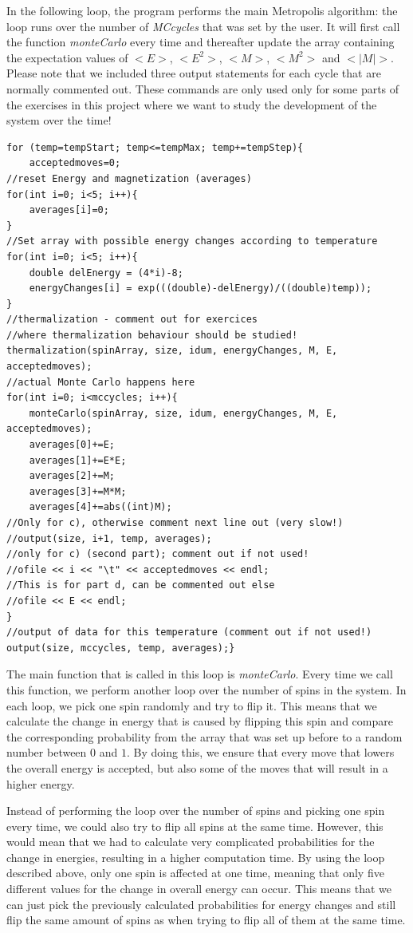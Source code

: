 \documentclass[10pt,a4paper]{article}
\begin{document}
In the following loop, the program performs the main Metropolis algorithm: the loop runs over the number of \emph{MCcycles} that was set by the user. It will first call the function \emph{monteCarlo} every time and thereafter update the array containing the expectation values of $<E>$, $<E^2>$, $<M>$, $<M^2>$ and $<|M|>$. Please note that we included three output statements for each cycle that are normally commented out. These commands are only used only for some parts of the exercises in this project where we want to study the development of the system over the time!

\begin{lstlisting}
for (temp=tempStart; temp<=tempMax; temp+=tempStep){
	acceptedmoves=0;
//reset Energy and magnetization (averages)
for(int i=0; i<5; i++){
	averages[i]=0;
}
//Set array with possible energy changes according to temperature
for(int i=0; i<5; i++){
	double delEnergy = (4*i)-8;
	energyChanges[i] = exp(((double)-delEnergy)/((double)temp));
}
//thermalization - comment out for exercices
//where thermalization behaviour should be studied!
thermalization(spinArray, size, idum, energyChanges, M, E, acceptedmoves);
//actual Monte Carlo happens here
for(int i=0; i<mccycles; i++){
	monteCarlo(spinArray, size, idum, energyChanges, M, E, acceptedmoves);
	averages[0]+=E;
	averages[1]+=E*E;
	averages[2]+=M;
	averages[3]+=M*M;
	averages[4]+=abs((int)M);
//Only for c), otherwise comment next line out (very slow!)
//output(size, i+1, temp, averages);
//only for c) (second part); comment out if not used!
//ofile << i << "\t" << acceptedmoves << endl;
//This is for part d, can be commented out else
//ofile << E << endl;
}
//output of data for this temperature (comment out if not used!)
output(size, mccycles, temp, averages);}
\end{lstlisting}

The main function that is called in this loop is \emph{monteCarlo}. Every time we call this function, we perform another loop over the number of spins in the system. In each loop, we pick one spin randomly and try to flip it. This means that we calculate the change in energy that is caused by flipping this spin and compare the corresponding probability from the array that was set up before to a random number between $0$ and $1$. By doing this, we ensure that every move that lowers the overall energy is accepted, but also some of the moves that will result in a higher energy.

Instead of performing the loop over the number of spins and picking one spin every time, we could also try to flip all spins at the same time. However, this would mean that we had to calculate very complicated probabilities for the change in energies, resulting in a higher computation time. By using the loop described above, only one spin is affected at one time, meaning that only five different values for the change in overall energy can occur. This means that we can just pick the previously calculated probabilities for energy changes and still flip the same amount of spins as when trying to flip all of them at the same time.
\end{document}
